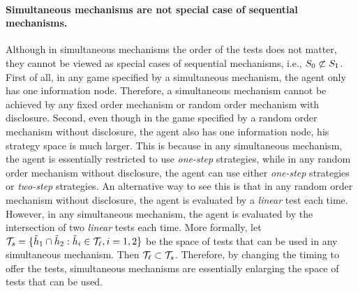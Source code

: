 \paragraph{Simultaneous mechanisms are not special case of sequential mechanisms.}
Although in simultaneous mechanisms the order of the tests does not matter, they cannot be viewed as special cases of sequential mechanisms, i.e.,  $S_0\not\subset S_1$.
First of all, in any game specified by a simultaneous mechanism, the agent only has one information node.
Therefore, a simultaneous mechanism cannot be achieved by any fixed order mechanism or random order mechanism with disclosure.
Second, even though in the game specified by a random order mechanism without disclosure, the agent also has one information node, his strategy space is much larger.
This is because in any simultaneous mechanism, the agent is essentially restricted to use \emph{one-step} strategies, while in any random order mechanism without disclosure, the agent can use either \emph{one-step} strategies or \emph{two-step} strategies. 
An alternative way to see this is that in any random order mechanism without disclosure, the agent is evaluated by a \emph{linear} test each time.
However, in any simultaneous mechanism, the agent is evaluated by the intersection of two \emph{linear} tests each time. 
More formally, let $\mathcal{T}_{s}=\{\tilde{h}_1\cap\tilde{h}_2:\tilde{h}_i\in \mathcal{T}_{\ell}, i=1,2\}$ be the space of tests that can be used in any simultaneous mechanism.
Then $\mathcal{T}_{\ell}\subset \mathcal{T}_{s}$.
Therefore, by changing the timing to offer the tests, simultaneous mechanisms are essentially enlarging the space of tests that can be used.

